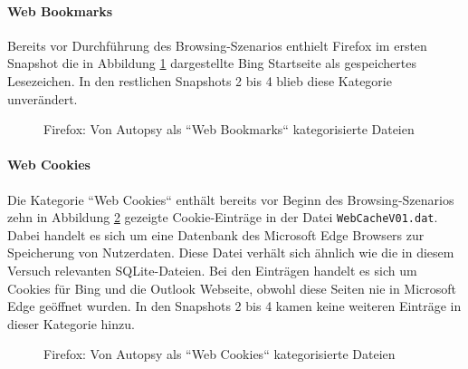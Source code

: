 \begin{appendices}
\paragraph*{Web Bookmarks}
Bereits vor Durchführung des Browsing-Szenarios enthielt Firefox im ersten Snapshot die in Abbildung \ref{img:firefox-web-bookmarks} dargestellte Bing Startseite als gespeichertes Lesezeichen. In den restlichen Snapshots 2 bis 4 blieb diese Kategorie unverändert.
\begin{figure}[h!]
	\centerline{}
	\caption{Firefox: Von Autopsy als ``Web Bookmarks`` kategorisierte Dateien}
	\label{img:firefox-web-bookmarks}  
\end{figure}

\paragraph*{Web Cookies}
Die Kategorie ``Web Cookies`` enthält bereits vor Beginn des Browsing-Szenarios zehn in Abbildung \ref{img:firefox-web-cookies} gezeigte Cookie-Einträge in der Datei \texttt{WebCacheV01.dat}. Dabei handelt es sich um eine Datenbank des Microsoft Edge Browsers zur Speicherung von Nutzerdaten. Diese Datei verhält sich ähnlich wie die in diesem Versuch relevanten SQLite-Dateien. Bei den Einträgen handelt es sich um Cookies für Bing und die Outlook Webseite, obwohl diese Seiten nie in Microsoft Edge geöffnet wurden. In den Snapshots 2 bis 4 kamen keine weiteren Einträge in dieser Kategorie hinzu.
\begin{figure}[h!]
	\centerline{}
	\caption{Firefox: Von Autopsy als ``Web Cookies`` kategorisierte Dateien}
	\label{img:firefox-web-cookies}  
\end{figure}


\end{appendices}
